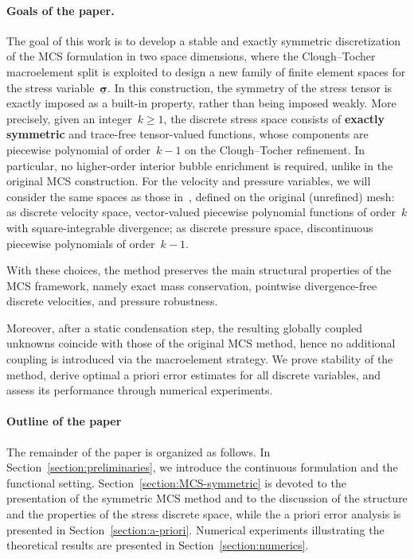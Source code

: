 \documentclass[a4paper,twoside,10pt]{article}
\theoremstyle{plain}
\theoremstyle{remark}
\theoremstyle{definition}
\numberwithin{equation}{section}
\numberwithin{figure}{section}
\newcommand{\sigmabf}{\underline{\boldsymbol{\sigma}}}
\begin{document}
\paragraph*{Goals of the paper.}
The goal of this work is to develop
a stable and exactly symmetric discretization of the MCS formulation in two space dimensions,
where the Clough--Tocher macroelement split is exploited
to design a new family of finite element spaces for the stress variable~$\sigmabf$.
In this construction,
the symmetry of the stress tensor is exactly imposed as a built-in property,
rather than being imposed weakly.
More precisely,
given an integer~$k \geq 1$,
the discrete stress space consists of \textbf{exactly symmetric} and trace-free
tensor-valued functions,
whose components are
piecewise polynomial of order~$k-1$
on the Clough--Tocher refinement.
In particular,
no higher-order interior bubble enrichment is required,
unlike in the original MCS construction.
For the velocity and pressure variables,
we will consider the same spaces as those in~\cite{Gopalakrishnan-Lederer-Schoberl:2020},
defined on the original (unrefined) mesh:
as discrete velocity space,
vector-valued piecewise polynomial functions of order~$k$
with square-integrable divergence;
as discrete pressure space,
discontinuous piecewise polynomials of order~$k-1$.

With these choices,
the method preserves the main structural properties of the MCS framework,
namely exact mass conservation,
pointwise divergence-free discrete velocities,
and pressure robustness.

Moreover,
after a static condensation step,
the resulting globally coupled unknowns coincide with those of the original MCS method,
hence no additional coupling is introduced via the macroelement strategy.
We prove stability of the method,
derive optimal a priori error estimates for all discrete variables,
and assess its performance through numerical experiments.



\paragraph*{Outline of the paper} 
The remainder of the paper is organized as follows.
In Section~\ref{section:preliminaries},
we introduce the continuous formulation and the functional setting.
Section~\ref{section:MCS-symmetric} is devoted to the presentation of the symmetric MCS method
and to the discussion of the structure and the properties of the stress discrete space,
while the a priori error analysis is presented in Section~\ref{section:a-priori}.
Numerical experiments illustrating the theoretical results are presented in Section~\ref{section:numerics}.
\end{document}
